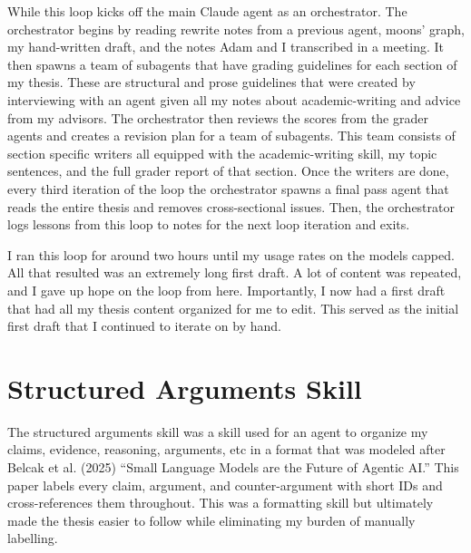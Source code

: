 While this loop kicks off the main Claude agent as an orchestrator. The orchestrator begins by reading rewrite notes from a previous agent, moons' graph, my hand-written draft, and the notes Adam and I transcribed in a meeting. It then spawns a team of subagents that have grading guidelines for each section of my thesis. These are structural and prose guidelines that were created by interviewing with an agent given all my notes about academic-writing and advice from my advisors. The orchestrator then reviews the scores from the grader agents and creates a revision plan for a team of subagents. This team consists of section specific writers all equipped with the academic-writing skill, my topic sentences, and the full grader report of that section. Once the writers are done, every third iteration of the loop the orchestrator spawns a final pass agent that reads the entire thesis and removes cross-sectional issues. Then, the orchestrator logs lessons from this loop to notes for the next loop iteration and exits.

I ran this loop for around two hours until my usage rates on the models capped. All that resulted was an extremely long first draft. A lot of content was repeated, and I gave up hope on the loop from here. Importantly, I now had a first draft that had all my thesis content organized for me to edit. This served as the initial first draft that I continued to iterate on by hand.

\section{Structured Arguments Skill}

The structured arguments skill was a skill used for an agent to organize my claims, evidence, reasoning, arguments, etc in a format that was modeled after Belcak et al. (2025) ``Small Language Models are the Future of Agentic AI.'' This paper labels every claim, argument, and counter-argument with short IDs and cross-references them throughout. This was a formatting skill but ultimately made the thesis easier to follow while eliminating my burden of manually labelling.

